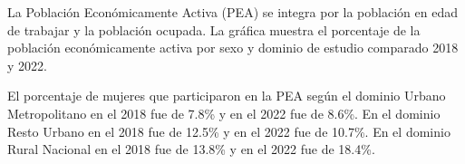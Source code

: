 La Población Económicamente Activa (PEA) se integra por la población en edad de trabajar y la población ocupada. La gráfica muestra el porcentaje de la población económicamente activa por sexo y dominio de estudio comparado 2018 y 2022. 

El porcentaje de mujeres que participaron en la PEA según el dominio Urbano Metropolitano en el 2018 fue de 7.8\% y en el 2022 fue de 8.6\%. En el dominio Resto Urbano en el 2018 fue de 12.5\% y en el 2022 fue de 10.7\%. En el dominio Rural Nacional en el 2018 fue de 13.8\%  y en el 2022 fue de 18.4\%. 

